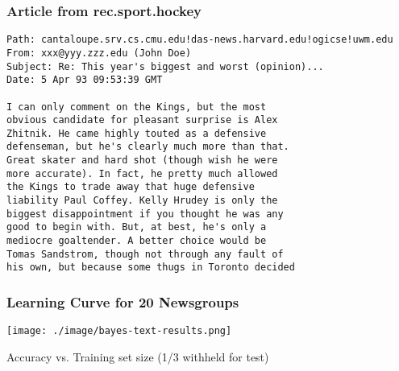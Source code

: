 \documentclass{beamer}
\begin{document}
\begin{frame}[fragile]
\frametitle{Article from rec.sport.hockey}
\label{sec-7-14}

\small

\begin{verbatim}
Path: cantaloupe.srv.cs.cmu.edu!das-news.harvard.edu!ogicse!uwm.edu
From: xxx@yyy.zzz.edu (John Doe)
Subject: Re: This year's biggest and worst (opinion)...
Date: 5 Apr 93 09:53:39 GMT

I can only comment on the Kings, but the most 
obvious candidate for pleasant surprise is Alex
Zhitnik. He came highly touted as a defensive 
defenseman, but he's clearly much more than that. 
Great skater and hard shot (though wish he were 
more accurate). In fact, he pretty much allowed 
the Kings to trade away that huge defensive 
liability Paul Coffey. Kelly Hrudey is only the 
biggest disappointment if you thought he was any 
good to begin with. But, at best, he's only a 
mediocre goaltender. A better choice would be 
Tomas Sandstrom, though not through any fault of 
his own, but because some thugs in Toronto decided
\end{verbatim}
\end{frame}
\begin{frame}
\frametitle{Learning Curve for 20 Newsgroups}
\label{sec-7-15}

\texttt{[image: ./image/bayes-text-results.png]}

\centerline{Accuracy vs. Training set size (1/3 withheld for test)}
\end{frame}
\end{document}
